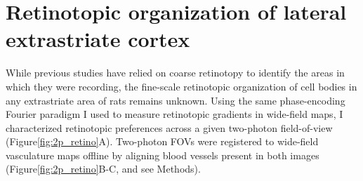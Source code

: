 \section{Retinotopic organization of lateral extrastriate cortex}
While previous studies have relied on coarse retinotopy to identify the areas in which they were recording, the fine-scale retinotopic organization of cell bodies in any extrastriate area of rats remains unknown. Using the same phase-encoding Fourier paradigm I used to measure retinotopic gradients in wide-field maps, I characterized retinotopic preferences across a given two-photon field-of-view (Figure\ref{fig:2p_retino}A). Two-photon FOVs were registered to wide-field vasculature maps offline by aligning blood vessels present in both images (Figure\ref{fig:2p_retino}B-C, and see Methods). 

